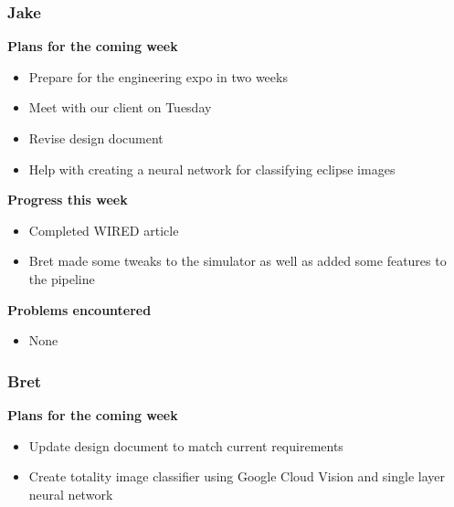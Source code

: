 \documentclass[10pt, onecolumn, draftclsnofoot, letterpaper, compsoc]{IEEEtran}
\begin{document}
    \subsubsection{Jake}

    \noindent \textbf{Plans for the coming week}

    \begin{itemize}

    \item Prepare for the engineering expo in two weeks
    \item Meet with our client on Tuesday
    \item Revise design document
    \item Help with creating a neural network for classifying eclipse images

    \end{itemize}

    \noindent \textbf{Progress this week}

    \begin{itemize}

    \item Completed WIRED article
    \item Bret made some tweaks to the simulator as well as added some features to the pipeline

    \end{itemize}

    \noindent \textbf{Problems encountered}

    \begin{itemize}

    \item None

    \end{itemize}

    \subsubsection{Bret}

    \noindent \textbf{Plans for the coming week}

    \begin{itemize}

    \item Update design document to match current requirements
    \item Create totality image classifier using Google Cloud Vision and single
      layer neural network

    \end{itemize}
\end{document}
